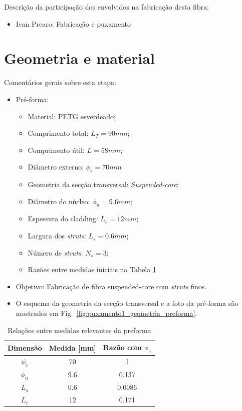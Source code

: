 \documentclass[12pt,a4paper]{article}
\newcommand{\diameter}{\phi}
\begin{document}
\tableofcontents
\newpage

  Descrição da participação dos envolvidos na fabricação desta fibra:
  \begin{itemize}
    \item Ivan Prearo: Fabricação e puxamento
  \end{itemize}

  \section{Geometria e material}
  \label{sec:geometria}

  Comentários gerais sobre esta etapa:
  \begin{itemize}
    \item Pré-forma:
    \begin{itemize}
      \item Material: PETG esverdeado;
      \item Comprimento total: \(L_T = 90 mm\);
      \item Comprimento útil: \(L = 58 mm\); 
      \item Diâmetro externo: \(\diameter_e = 70 mm\)
      \item Geometria da secção transversal: \textit{Suspended-core};
      \item Diâmetro do núcleo: \(\diameter_n = 9.6 mm\);
      \item Espessura do cladding: \(L_c = 12 mm\);
      \item Largura dos \textit{struts}: \(L_s = 0.6 mm\);
      \item Número de \textit{struts}: \(N_s = 3\);
      \item Razões entre medidas iniciais na Tabela \ref{tab:puxamento1_razoes_das_dimensoes}
    \end{itemize}
    \item Objetivo: Fabricação de fibra suspended-core com \textit{struts} finos.
    \item O esquema da geometria da secção transversal e a foto da pré-forma são mostrados em Fig.~\ref{fig:puxamento1_geometria_preforma}.
  \end{itemize}

  \begin{table}[H]
  \centering
  \begin{tabular}{c|c|c}
    Dimensão & Medida [mm] & Razão com $\diameter_e$ \\
    \hline
    $\diameter_c$ & 70 & 1 \\
    $\diameter_n$ & 9.6 & 0.137 \\
    $L_s$ & 0.6 & 0.0086 \\
    $L_c$ & 12 & 0.171
  \end{tabular}
  \caption{Relações entre medidas relevantes da preforma}
  \label{tab:puxamento1_razoes_das_dimensoes}
  \end{table}
\end{document}
